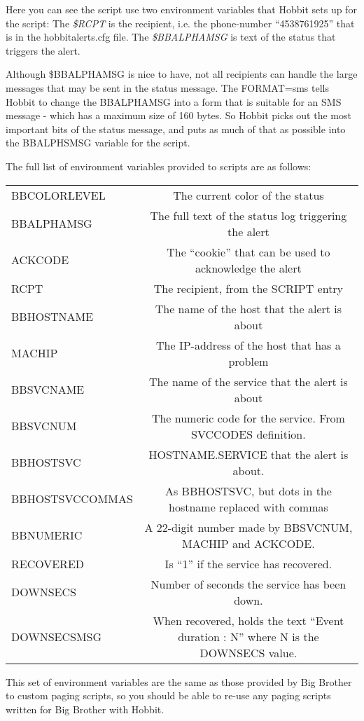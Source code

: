  Here you can see the script use two environment variables that Hobbit sets up for the script: The \emph{\$RCPT}
 is the recipient, i.e. the phone-number ``4538761925'' that is in the hobbitalerts.cfg file. The \emph{\$BBALPHAMSG}
 is text of the status that triggers the alert.


 Although \$BBALPHAMSG is nice to have, not all recipients can handle the large messages that may be sent in the status message. The FORMAT=sms tells Hobbit to change the BBALPHAMSG into a form that is suitable for an SMS message - which has a maximum size of 160 bytes. So Hobbit picks out the most important bits of the status message, and puts as much of that as possible into the BBALPHSMSG variable for the script.


 The full list of environment variables provided to scripts are as follows:


\begin{tabular}{lc}
BBCOLORLEVEL &The current color of the status \\
BBALPHAMSG &The full text of the status log triggering the alert \\
ACKCODE &The ``cookie'' that can be used to acknowledge the alert \\
RCPT &The recipient, from the SCRIPT entry \\
BBHOSTNAME &The name of the host that the alert is about \\
MACHIP &The IP-address of the host that has a problem \\
BBSVCNAME &The name of the service that the alert is about \\
BBSVCNUM &The numeric code for the service. From SVCCODES definition. \\
BBHOSTSVC &HOSTNAME.SERVICE that the alert is about. \\
BBHOSTSVCCOMMAS  &As BBHOSTSVC, but dots in the hostname replaced with commas \\
BBNUMERIC &A 22-digit number made by BBSVCNUM, MACHIP and ACKCODE. \\
RECOVERED &Is ``1'' if the service has recovered. \\
DOWNSECS &Number of seconds the service has been down. \\
DOWNSECSMSG &When recovered, holds the text ``Event duration : N'' where N is the DOWNSECS value.

\end{tabular}



 This set of environment variables are the same as those provided by Big Brother to custom paging scripts, so you should be able to re-use any paging scripts written for Big Brother with Hobbit.
